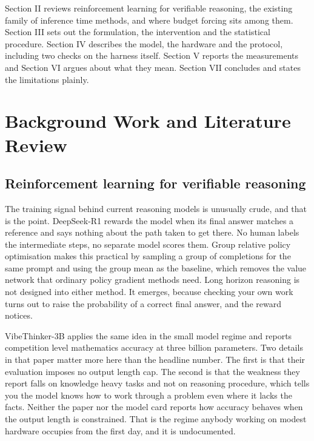 \documentclass[conference]{IEEEtran}
\begin{document}
Section II reviews reinforcement learning for verifiable reasoning, the existing
family of inference time methods, and where budget forcing sits among them.
Section III sets out the formulation, the intervention and the statistical
procedure. Section IV describes the model, the hardware and the protocol,
including two checks on the harness itself. Section V reports the measurements
and Section VI argues about what they mean. Section VII concludes and states the
limitations plainly.

\section{Background Work and Literature Review}

\subsection{Reinforcement learning for verifiable reasoning}

The training signal behind current reasoning models is unusually crude, and that
is the point. DeepSeek-R1 \cite{deepseekr1} rewards the model when its final
answer matches a reference and says nothing about the path taken to get there.
No human labels the intermediate steps, no separate model scores them. Group
relative policy optimisation \cite{deepseekmath} makes this practical by sampling
a group of completions for the same prompt and using the group mean as the
baseline, which removes the value network that ordinary policy gradient methods
need. Long horizon reasoning is not designed into either method. It emerges,
because checking your own work turns out to raise the probability of a correct
final answer, and the reward notices.

VibeThinker-3B \cite{vibethinker} applies the same idea in the small model
regime and reports competition level mathematics accuracy at three billion
parameters. Two details in that paper matter more here than the headline number.
The first is that their evaluation imposes no output length cap. The second is
that the weakness they report falls on knowledge heavy tasks and not on
reasoning procedure, which tells you the model knows how to work through a
problem even where it lacks the facts. Neither the paper nor the model card
reports how accuracy behaves when the output length is constrained. That is the
regime anybody working on modest hardware occupies from the first day, and it is
undocumented.
\end{document}
